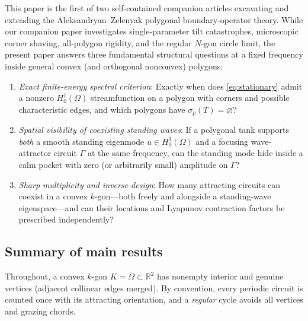 \documentclass[11pt,reqno]{amsart}
\theoremstyle{definition}
\theoremstyle{remark}
\newcommand{\R}{\mathbb{R}}
\begin{document}
This paper is the first of two self-contained companion articles excavating and extending the Aleksandryan--Zelenyak polygonal boundary-operator theory. While our companion paper \cite{Paper2} investigates single-parameter tilt catastrophes, microscopic corner shaving, all-polygon rigidity, and the regular $N$-gon circle limit, the present paper answers three fundamental structural questions at a fixed frequency inside general convex (and orthogonal nonconvex) polygons:
\begin{enumerate}
  \item \emph{Exact finite-energy spectral criterion}: Exactly when does \eqref{eq:stationary} admit a nonzero $H_0^1(\Omega)$ streamfunction on a polygon with corners and possible characteristic edges, and which polygons have $\sigma_p(T) = \varnothing$?
  \item \emph{Spatial visibility of coexisting standing waves}: If a polygonal tank supports \emph{both} a smooth standing eigenmode $u \in H_0^1(\Omega)$ and a focusing wave-attractor circuit $\Gamma$ at the same frequency, can the standing mode hide inside a calm pocket with zero (or arbitrarily small) amplitude on $\Gamma$?
  \item \emph{Sharp multiplicity and inverse design}: How many attracting circuits can coexist in a convex $k$-gon---both freely and alongside a standing-wave eigenspace---and can their locations and Lyapunov contraction factors be prescribed independently?
\end{enumerate}

\subsection*{Summary of main results}
Throughout, a convex $k$-gon $K = \overline{\Omega} \subset \R^2$ has nonempty interior and genuine vertices (adjacent collinear edges merged). By convention, every periodic circuit is counted once with its attracting orientation, and a \emph{regular} cycle avoids all vertices and grazing chords.
\end{document}
